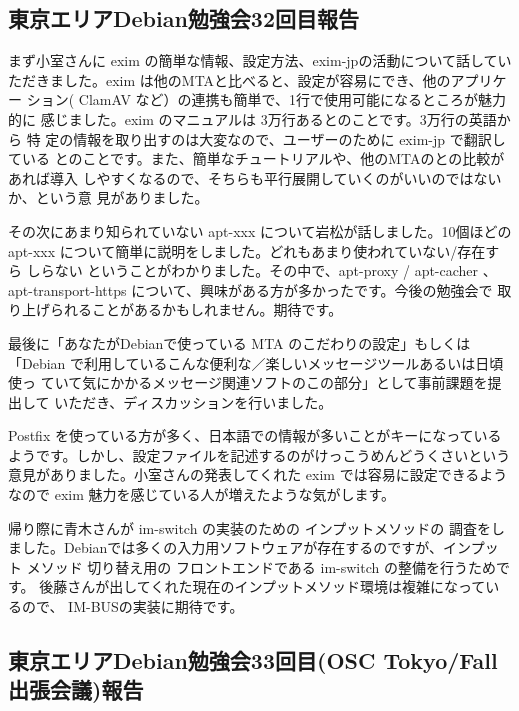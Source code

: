 \documentclass[mingoth,a4paper]{jsarticle}
\begin{document}

\subsection{東京エリアDebian勉強会32回目報告}


まず小室さんに exim の簡単な情報、設定方法、exim-jpの活動について話してい
ただきました。exim は他のMTAと比べると、設定が容易にでき、他のアプリケー
ション( ClamAV など）の連携も簡単で、1行で使用可能になるところが魅力的に
感じました。exim のマニュアルは 3万行あるとのことです。3万行の英語から 特
定の情報を取り出すのは大変なので、ユーザーのために exim-jp で翻訳している
とのことです。また、簡単なチュートリアルや、他のMTAのとの比較があれば導入
しやすくなるので、そちらも平行展開していくのがいいのではないか、という意
見がありました。

その次にあまり知られていない apt-xxx について岩松が話しました。10個ほどの
apt-xxx について簡単に説明をしました。どれもあまり使われていない/存在すら
しらない ということがわかりました。その中で、apt-proxy / apt-cacher 、
apt-transport-https について、興味がある方が多かったです。今後の勉強会で
取り上げられることがあるかもしれません。期待です。

最後に「あなたがDebianで使っている MTA のこだわりの設定」もしくは
「Debian で利用しているこんな便利な／楽しいメッセージツールあるいは日頃使っ
ていて気にかかるメッセージ関連ソフトのこの部分」として事前課題を提出して
いただき、ディスカッションを行いました。

Postfix を使っている方が多く、日本語での情報が多いことがキーになっている
ようです。しかし、設定ファイルを記述するのがけっこうめんどうくさいという
意見がありました。小室さんの発表してくれた exim では容易に設定できるよう
なので exim 魅力を感じている人が増えたような気がします。

帰り際に青木さんが im-switch の実装のための インプットメソッドの 調査をし
ました。Debianでは多くの入力用ソフトウェアが存在するのですが、インプット
メソッド 切り替え用の フロントエンドである im-switch の整備を行うためです。
後藤さんが出してくれた現在のインプットメソッド環境は複雑になっているので、
IM-BUSの実装に期待です。


\subsection{東京エリアDebian勉強会33回目(OSC Tokyo/Fall 出張会議)報告}
\end{document}
